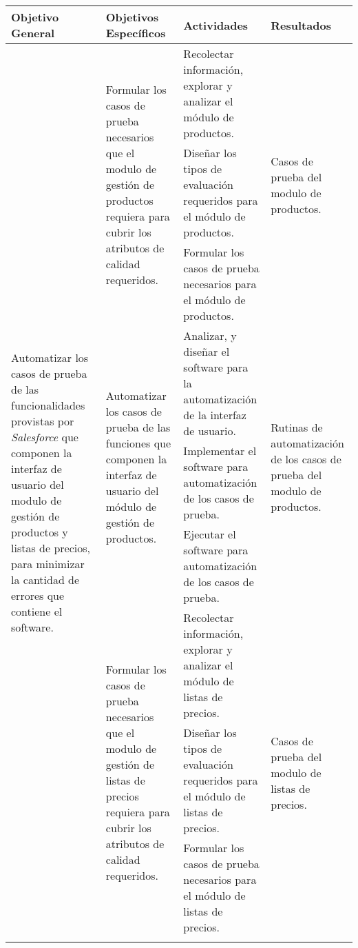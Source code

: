 \begin{sidewaystable}
\centering
\small
{\def\arraystretch{1.75}
\begin{tabular}{|l|l|p{6.5cm}|l|}
\hline
Objetivo General & Objetivos Específicos & Actividades & Resultados \\
\hline
\multirow{12}{4.0cm}{Automatizar los casos de prueba de las funcionalidades
provistas por \emph{Salesforce} que componen la interfaz de usuario del modulo
de gestión de productos y listas de precios, para minimizar la cantidad de
errores que contiene el software.} &
\multirow{3}{4.0cm}{Formular los casos de prueba necesarios que el modulo de
gestión de productos requiera para cubrir los atributos de calidad requeridos.} &
Recolectar información, explorar y analizar el módulo de productos. &
\multirow{3}{4.0cm}{Casos de prueba del modulo de productos.} \\
\cline{3-3}
& & Diseñar los tipos de evaluación requeridos para el módulo de productos. & \\
\cline{3-3}
& & Formular los casos de prueba necesarios para el módulo de productos. & \\
\cline{2-4}

& \multirow{3}{4.0cm}{Automatizar los casos de prueba de las funciones que
componen la interfaz de usuario del módulo de gestión de productos.} &
Analizar, y diseñar el software para la automatización de la interfaz de
usuario. &
\multirow{3}{4.0cm}{Rutinas de automatización de los casos de prueba del modulo
de productos.} \\
\cline{3-3}
& & Implementar el software para automatización de los casos de prueba. & \\
\cline{3-3}
& & Ejecutar el software para automatización de los casos de prueba. & \\
\cline{2-4}

& \multirow{3}{4.0cm}{Formular los casos de prueba necesarios que el modulo de
gestión de listas de precios requiera para cubrir los atributos de calidad
requeridos.} &
Recolectar información, explorar y analizar el módulo de listas de precios. &
\multirow{3}{4.0cm}{Casos de prueba del modulo de listas de precios.} \\
\cline{3-3}
& & Diseñar los tipos de evaluación requeridos para el módulo de listas de
precios. & \\
\cline{3-3}
& & Formular los casos de prueba necesarios para el módulo de listas de
precios. & \\
\cline{2-4}


\end{tabular}}
\end{sidewaystable}
